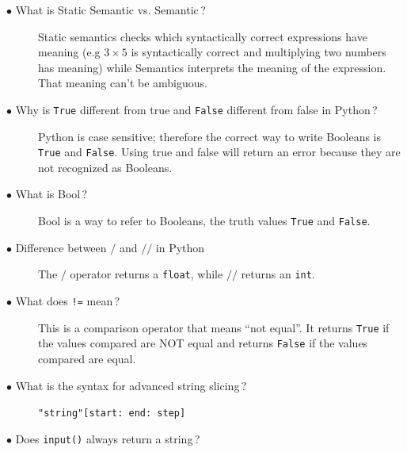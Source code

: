 \documentclass{article}
\newcommand{\inlinecode}[1]{\texttt{#1}}
\newcommand{\question}[1]{\item[$\bullet$ #1] \hfil}
\newenvironment{answer}{}{}
\newenvironment{faq}{\begin{description}}{\end{description}}
\begin{document}
	\begin{faq}
		
		\question{What is Static Semantic vs. Semantic\,?}
		
		\begin{answer}
			Static semantics checks which syntactically correct expressions have
			meaning (e.g $3 \times 5$ is syntactically correct and multiplying two numbers has
			meaning) while Semantics interprets the meaning of the expression. That
			meaning can't be ambiguous.
		\end{answer}
		
		\question{Why is \inlinecode{True} different from true and \inlinecode{False} different from false in Python\,?}
		
		\begin{answer}
			Python is case sensitive; therefore the correct way to write Booleans is \inlinecode{True}
			and \inlinecode{False}. Using true and false will return an error because they are not
			recognized as Booleans.
		\end{answer}
		
		\question{What is Bool\,?}
		
		\begin{answer}
			Bool is a way to refer to Booleans, the truth values \inlinecode{True} and \inlinecode{False}.
		\end{answer}
		
		\question{Difference between $/$ and $//$ in Python}
		
		\begin{answer}
			The $/$ operator returns a \inlinecode{float}, while $//$ returns an \inlinecode{int}.
		\end{answer}
		
		\question{What does \inlinecode{!=} mean\,?}
		
		\begin{answer}
			This is a comparison operator that means ``not equal''. It returns \inlinecode{True} if the
			values compared are NOT equal and returns \inlinecode{False} if the values compared
			are equal.
		\end{answer}
		
		\question{What is the syntax for advanced string slicing\,?}
		
		\begin{answer}
			\inlinecode{"string"[start: end: step]}
		\end{answer}
		
		\question{Does \inlinecode{input()} always return a string\,?}
		

\end{faq}
\end{document}
